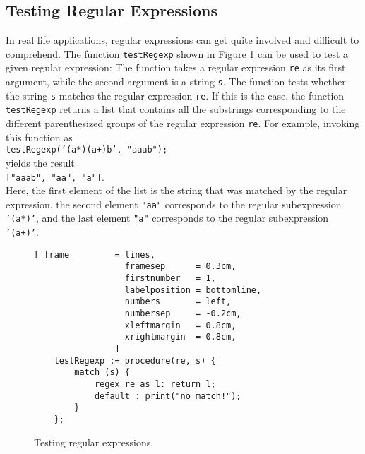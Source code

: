 \subsection{Testing Regular Expressions}
In real life applications, regular expressions can get quite involved and difficult to
comprehend.  The function \texttt{testRegexp} shown in Figure \ref{fig:test-regexp.stlx}
can be used to test a given regular expression:  The function takes a regular expression
\texttt{re} as its first argument, while the second argument is a string \texttt{s}.  The
function tests whether the string \texttt{s} matches the regular expression \texttt{re}.
If this is the case, the function \texttt{testRegexp} returns a list that contains all the
substrings corresponding to the different parenthesized groups of the regular expression
\texttt{re}.   For example,  invoking this function as
\\[0.2cm]
\hspace*{1.3cm}
\texttt{testRegexp('(a*)(a+)b', "aaab");}
\\[0.2cm]
yields the result
\\[0.2cm]
\hspace*{1.3cm}
\texttt{["aaab", "aa", "a"]}.
\\[0.2cm]
Here, the first element of the list is the string that was matched by the regular
expression, the second element \texttt{"aa"} corresponds to the regular subexpression
\texttt{'(a*)'}, and the last element \texttt{"a"} corresponds to the regular
subexpression \texttt{'(a+)'}.

\begin{figure}[!ht]
\centering
\begin{Verbatim}[ frame         = lines, 
                  framesep      = 0.3cm, 
                  firstnumber   = 1,
                  labelposition = bottomline,
                  numbers       = left,
                  numbersep     = -0.2cm,
                  xleftmargin   = 0.8cm,
                  xrightmargin  = 0.8cm,
                ]
    testRegexp := procedure(re, s) {
        match (s) {
            regex re as l: return l;
            default : print("no match!");
        }
    };
\end{Verbatim}
\vspace*{-0.3cm}
\caption{Testing regular expressions.}
\label{fig:test-regexp.stlx}
\end{figure}

